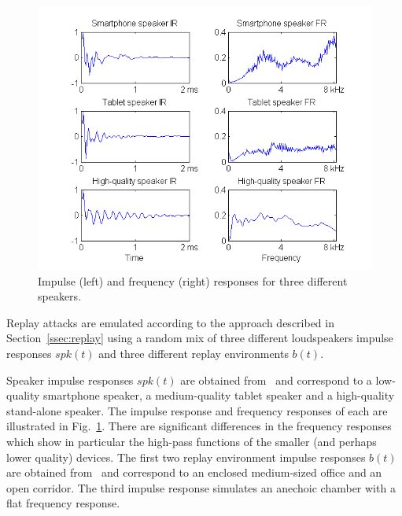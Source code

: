 
\begin{figure}
	\centering
	\includegraphics[width=1\linewidth]{Figs/IRs.png}
	\caption{Impulse (left) and frequency (right) responses for three different speakers.} %
	\label{fig::IRs}
\end{figure}

Replay attacks are emulated according to the approach described in Section~\ref{ssec:replay} 
using a random mix of three different loudspeakers impulse responses $spk(t)$ and three different replay environments $b(t)$.  

Speaker impulse responses $spk(t)$ are obtained from~\cite{Brown2014} and correspond to a low-quality smartphone speaker, a medium-quality tablet speaker and a high-quality stand-alone speaker.  The impulse response and frequency responses of each are illustrated in Fig.~\ref{fig::IRs}.  There are significant differences in the frequency responses which show in particular the high-pass functions of the smaller (and perhaps lower quality) devices.   The first two replay environment impulse responses $b(t)$ are obtained from~\cite{Jeub2009} and correspond to an enclosed medium-sized office and an open corridor.   %
The third impulse response simulates an anechoic chamber with a flat frequency response. 



